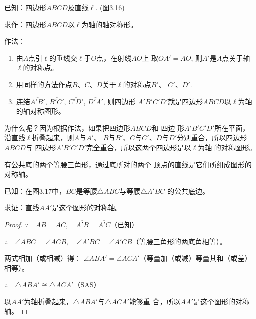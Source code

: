 \begin{example}
已知：四边形$ABCD$及直线$\ell$. (图3.16)

求作：四边形$ABCD$以$\ell$为轴的轴对称形。

作法：
\begin{enumerate}
\item 由$A$点引$\ell$的垂线交$\ell$于$O$点，在射线$AO$上
取$OA'=AO$, 则$A'$是$A$点关于轴$\ell$的对称点。
\item 用同样的方法作点$B$、$C$、$D$关于$\ell$的对称点$B'$、
$C'$、$D'$.
\item 连结$\overline{A'B'}$, $\overline{B'C'}$, $\overline{C'D'}$, $\overline{D'A'}$, 则四边形
$A'B'C'D'$就是四边形$ABCD$以$\ell$为轴的轴对称图形。
\end{enumerate}

为什么呢？因为根据作法，如果把四边形$ABCD$和 四边
形$A'B'C'D'$所在平面，沿直线$\ell$折叠起来，则$A$与$A'$、
$B$与$B'$、$C$与$C'$、$D$与$D'$分别重合，所以四边形$ABCD$与
四边形$A'B'C'D'$完全重合，所以这两个四边形是以$\ell$为轴
的对称图形。
\end{example}

\begin{example}
    有公共底的两个等腰三角形，通过底所对的两个
顶点的直线是它们所组成图形的对称轴。

已知：在图3.17中，$BC$是等腰$\triangle ABC$与等腰$\triangle A'BC$
的公共底边。

求证：直线$AA'$是这个图形的对称轴。
\end{example}

\begin{figure}[htp]
    \centering
{}
    \caption{}
\end{figure}

\begin{proof}
$\because\quad \overline{AB}=\overline{AC},\quad \overline{A'B}=\overline{A'C}$（已知）

$\therefore\quad \angle ABC=\angle ACB,\quad 
\angle A'BC=\angle A'CB$（等腰三角形的两底角相等）。

两式相加（或相减）得：
$\angle ABA'=\angle ACA'$（等量加（或减）等量其和（或差）
相等）。

$\therefore\quad \triangle ABA'\cong \triangle ACA'$（SAS）

以$AA'$为轴折叠起来，$\triangle ABA'$与$\triangle ACA'$能够重
合，所以$AA'$是这个图形的对称轴。
\end{proof}

